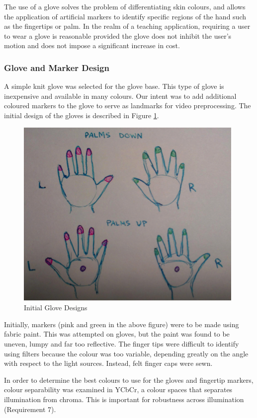 \documentclass[12pt]{article}
\begin{document}
The use of a glove solves the problem of differentiating skin colours, and allows the application of artificial markers to identify specific regions of the hand such as the fingertips or palm. In the realm of a teaching application, requiring a user to wear a glove is reasonable provided the glove does not inhibit the user’s motion and does not impose a significant increase in cost. 

\subsubsection{Glove and Marker Design}
A simple knit glove was selected for the glove base. This type of glove is inexpensive and available in many colours. Our intent was to add additional coloured markers to the glove to serve as landmarks for video preprocessing. The initial design of the gloves is described in Figure \ref{fig:glove}.

\begin{figure}[h]
  \centering
  \includegraphics[scale=1]{GloveDesign.png}
  \caption{Initial Glove Designs}
  \label{fig:glove}
\end{figure}

Initially, markers (pink and green in the above figure) were to be made using fabric paint. This was attempted on gloves, but the paint was found to be uneven, lumpy and far too reflective. The finger tips were difficult to identify using filters because the colour was too variable, depending greatly on the angle with respect to the light sources. Instead, felt finger caps were sewn. 

In order to determine the best colours to use for the gloves and fingertip markers, colour separability was examined in YCbCr, a colour spaces that separates illumination from chroma. This is important for robustness across illumination (Requirement 7). 
\end{document}
